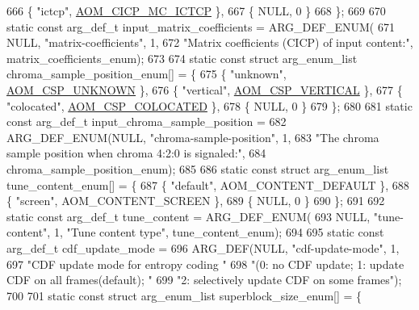 \begin{DoxyCodeInclude}
{{{{{{{666   \{ \textcolor{stringliteral}{"ictcp"}, \hyperlink{aom__image_8h_a6bc018ed9689367acae810bc58527081a7695b0577d3884a89c578f28f4237aee}{AOM\_CICP\_MC\_ICTCP} \},
667   \{ NULL, 0 \}
668 \};
669 
670 \textcolor{keyword}{static} \textcolor{keyword}{const} arg\_def\_t input\_matrix\_coefficients = ARG\_DEF\_ENUM(
671     NULL, \textcolor{stringliteral}{"matrix-coefficients"}, 1,
672     \textcolor{stringliteral}{"Matrix coefficients (CICP) of input content:"}, matrix\_coefficients\_enum);
673 
674 \textcolor{keyword}{static} \textcolor{keyword}{const} \textcolor{keyword}{struct }arg\_enum\_list chroma\_sample\_position\_enum[] = \{
675   \{ \textcolor{stringliteral}{"unknown"}, \hyperlink{aom__image_8h_a10590253ef3dbde7e93ed5d4b4e0e73ba7843506f3e28f720be0d4f03237fb48c}{AOM\_CSP\_UNKNOWN} \},
676   \{ \textcolor{stringliteral}{"vertical"}, \hyperlink{aom__image_8h_a10590253ef3dbde7e93ed5d4b4e0e73baf95ced9b8288642205301cc51e0b55c6}{AOM\_CSP\_VERTICAL} \},
677   \{ \textcolor{stringliteral}{"colocated"}, \hyperlink{aom__image_8h_a10590253ef3dbde7e93ed5d4b4e0e73ba01ef7204c2234ef43acfd493d5e18c84}{AOM\_CSP\_COLOCATED} \},
678   \{ NULL, 0 \}
679 \};
680 
681 \textcolor{keyword}{static} \textcolor{keyword}{const} arg\_def\_t input\_chroma\_sample\_position =
682     ARG\_DEF\_ENUM(NULL, \textcolor{stringliteral}{"chroma-sample-position"}, 1,
683                  \textcolor{stringliteral}{"The chroma sample position when chroma 4:2:0 is signaled:"},
684                  chroma\_sample\_position\_enum);
685 
686 \textcolor{keyword}{static} \textcolor{keyword}{const} \textcolor{keyword}{struct }arg\_enum\_list tune\_content\_enum[] = \{
687   \{ \textcolor{stringliteral}{"default"}, AOM\_CONTENT\_DEFAULT \},
688   \{ \textcolor{stringliteral}{"screen"}, AOM\_CONTENT\_SCREEN \},
689   \{ NULL, 0 \}
690 \};
691 
692 \textcolor{keyword}{static} \textcolor{keyword}{const} arg\_def\_t tune\_content = ARG\_DEF\_ENUM(
693     NULL, \textcolor{stringliteral}{"tune-content"}, 1, \textcolor{stringliteral}{"Tune content type"}, tune\_content\_enum);
694 
695 \textcolor{keyword}{static} \textcolor{keyword}{const} arg\_def\_t cdf\_update\_mode =
696     ARG\_DEF(NULL, \textcolor{stringliteral}{"cdf-update-mode"}, 1,
697             \textcolor{stringliteral}{"CDF update mode for entropy coding "}
698             \textcolor{stringliteral}{"(0: no CDF update; 1: update CDF on all frames(default); "}
699             \textcolor{stringliteral}{"2: selectively update CDF on some frames"});
700 
701 \textcolor{keyword}{static} \textcolor{keyword}{const} \textcolor{keyword}{struct }arg\_enum\_list superblock\_size\_enum[] = \{
}}}}}}}
\end{DoxyCodeInclude}
